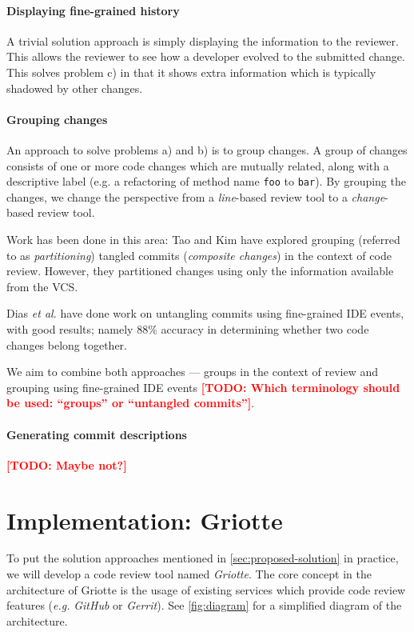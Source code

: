 \documentclass[conference,a4paper]{IEEEtran}
\newcommand{\code}[1]{\texttt{#1}}
\newcommand{\todo}[1]{\textbf{\textcolor{red}{{[}TODO: #1{]}}}}
\begin{document}
\paragraph{Displaying fine-grained history}

A trivial solution approach is simply displaying the information to
the reviewer. This allows the reviewer to see how a developer evolved
to the submitted change. This solves problem c) in that it shows extra
information which is typically shadowed by other changes.

\paragraph{Grouping changes}

An approach to solve problems a) and b) %
is to group changes. A group of changes consists of one or more code
changes which are mutually related, along with a descriptive label
(e.g. a refactoring of method name \code{foo} to \code{bar}). By
grouping the changes, we change the perspective from a
\textit{line}-based review tool to a \textit{change}-based review
tool.

Work has been done in this area: Tao and Kim\cite{Tao15a} have
explored grouping (referred to as \textit{partitioning}) tangled
commits (\textit{composite changes}) in the context of code
review. However, they partitioned changes using only the information
available from the VCS.

Dias \textit{et al.}\cite{Dias15a} have done work on untangling
commits using fine-grained IDE events, with good results; namely 88\%
accuracy in determining whether two code changes belong together.

We aim to combine both approaches --- groups in the context of review
and grouping using fine-grained IDE events \todo{Which terminology
  should be used: ``groups'' or ``untangled commits''}.

\paragraph{Generating commit descriptions}

\todo{Maybe not?}

\section{Implementation: Griotte}
\label{sec:impl-griotte}

To put the solution approaches mentioned in
\cref{sec:proposed-solution} in practice, we will develop a code
review tool named \textit{Griotte}. The core concept in the
architecture of Griotte is the usage of existing services which
provide code review features (\textit{e.g.} \textit{GitHub} or
\textit{Gerrit}). See \cref{fig:diagram} for a simplified diagram of the
architecture.
\end{document}
